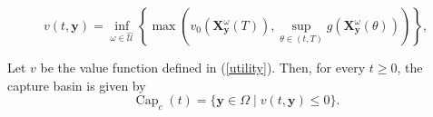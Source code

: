 \documentclass[10pt,a4paper]{amsart}
\begin{document}
\begin{equation}\label{utility}
v(t, \mathbf{y}) = \inf_{\omega \in \hat{\mathcal{U}}}\left\{ \max \left(  v_0(\mathbf{X}_{\mathbf{y}}^\omega(T)), \sup_{\theta \in (t, T)} g\left(\mathbf{X}_{\mathbf{y}}^\omega(\theta)\right) \right)  \right\},
\end{equation}

\begin{theorem}\label{thm1}
 Let \( v \) be the value function defined in (\ref{utility}). Then, for every \( t \geq 0 \), the capture basin is given by
\[ 
\operatorname{Cap}_{c}(t) = \{\mathbf{y} \in \Omega \mid v(t, \mathbf{y}) \leq 0\}.
\]
\end{theorem}
\end{document}
